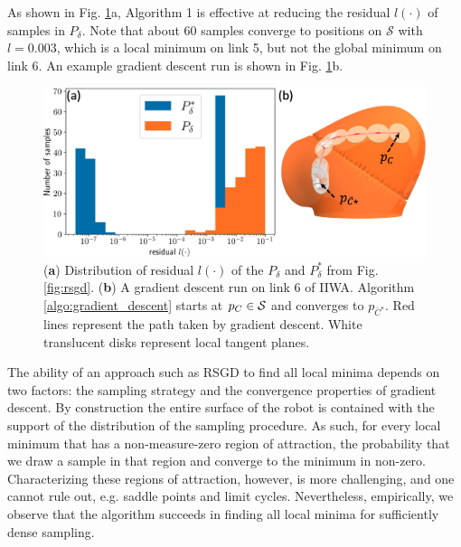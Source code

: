 As shown in Fig. \ref{fig:gradient_descent}a, Algorithm 1 is effective at reducing the residual $l(\cdot)$ of samples in $P_\delta$. Note that about 60 samples converge to positions on $\mathcal{S}$ with $l = 0.003$, which is a local minimum on link 5, but not the global minimum on link 6. An example gradient descent run is shown in Fig. \ref{fig:gradient_descent}b.
\begin{figure}[h]
\centering
\includegraphics[width=0.85\linewidth]{figures/05_force_from_torque/gradient_descent.png}
\caption{(\textbf{a}) Distribution of residual $l(\cdot)$ of the $P_\delta$ and $P_\delta^*$ from Fig. \ref{fig:rsgd}. (\textbf{b}) A gradient descent run on link 6 of IIWA. Algorithm \ref{algo:gradient_descent} starts at $p_{C} \in \mathcal{S}$ and converges to $p_{\bar{C}^\star}$. Red lines represent the path taken by gradient descent. White translucent disks represent local tangent planes. }
\label{fig:gradient_descent}
\end{figure}

The ability of an approach such as RSGD to find all local minima depends on two factors: the sampling strategy and the convergence properties of gradient descent. 
By construction the entire surface of the robot is contained with the support of the distribution of the sampling procedure.
As such, for every local minimum that has a non-measure-zero region of attraction, the probability that we draw a sample in that region and converge to the minimum in non-zero.  
Characterizing these regions of attraction, however, is more challenging, and one cannot rule out, e.g. saddle points and limit cycles. 
Nevertheless, empirically, we observe that the algorithm succeeds in finding all local minima for sufficiently dense sampling.


